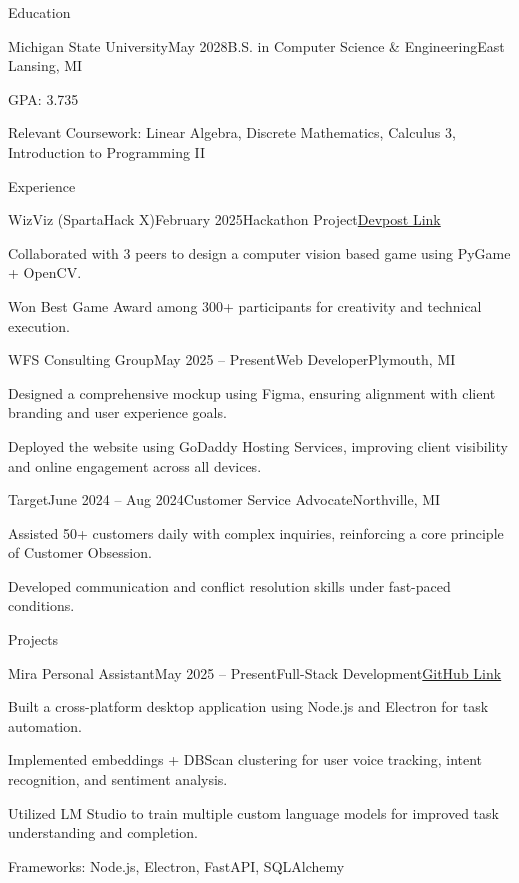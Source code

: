 \documentclass[
	11pt
]{resume}
\begin{document}
	\begin{rSection}{Education}
		\begin{rSectionEntry}{Michigan State University}{May 2028}{B.S. in Computer Science \& Engineering}{East Lansing, MI}
			\item GPA: 3.735
			\item Relevant Coursework: Linear Algebra, Discrete Mathematics, Calculus 3, Introduction to Programming II
		\end{rSectionEntry}
	\end{rSection}

	\begin{rSection}{Experience}
		\begin{rSectionEntry}{WizViz (SpartaHack X)}{February 2025}{Hackathon Project}{\href{https://devpost.com/software/wizviz}{Devpost Link}}
			\item Collaborated with 3 peers to design a computer vision based game using PyGame + OpenCV.
			\item Won Best Game Award among 300+ participants for creativity and technical execution.
		\end{rSectionEntry}

		\begin{rSectionEntry}{WFS Consulting Group}{May 2025 -- Present}{Web Developer}{Plymouth, MI}
			\item Designed a comprehensive mockup using Figma, ensuring alignment with client branding and user experience goals.
			\item Deployed the website using GoDaddy Hosting Services, improving client visibility and online engagement across all devices.
		\end{rSectionEntry}

		\begin{rSectionEntry}{Target}{June 2024 -- Aug 2024}{Customer Service Advocate}{Northville, MI}
			\item Assisted 50+ customers daily with complex inquiries, reinforcing a core principle of Customer Obsession.
			\item Developed communication and conflict resolution skills under fast-paced conditions.
		\end{rSectionEntry}
	\end{rSection}

	\begin{rSection}{Projects}
		\begin{rSectionEntry}{Mira Personal Assistant}{May 2025 -- Present}{Full-Stack Development}{\href{https://github.com/mira-assistant}{GitHub Link}}
			\item Built a cross-platform desktop application using Node.js and Electron for task automation.
			\item Implemented embeddings + DBScan clustering for user voice tracking, intent recognition, and sentiment analysis.
			\item Utilized LM Studio to train multiple custom language models for improved task understanding and completion.
			\item Frameworks: Node.js, Electron, FastAPI, SQLAlchemy
		\end{rSectionEntry}
	\end{rSection}
\end{document}
